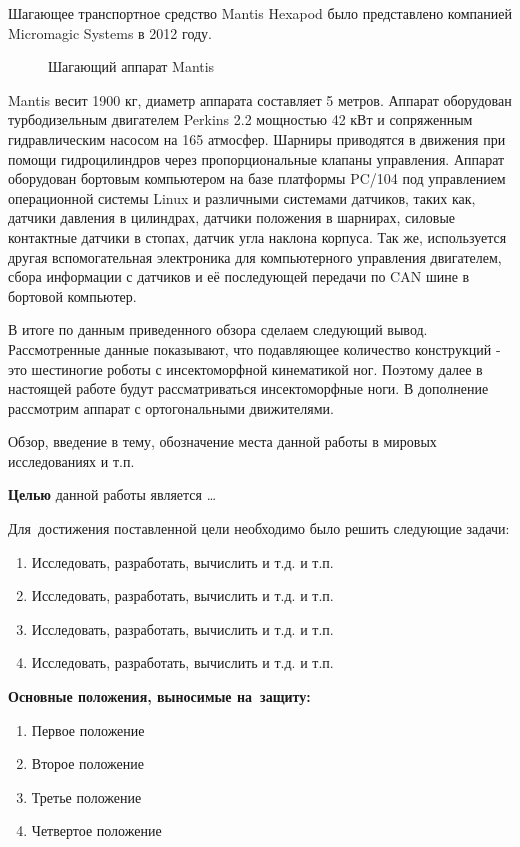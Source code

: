 Шагающее транспортное средство Mantis Hexapod было представлено компанией Micromagic Systems в 2012 году.

\begin{figure}
\center{\texttt{[image: 1209116\_628585443829653\_1753427504\_n]}}
\caption{Шагающий аппарат Mantis}
\end{figure}

Mantis весит 1900 кг, диаметр аппарата составляет 5 метров. Аппарат оборудован турбодизельным двигателем Perkins 2.2 мощностью 42 кВт и сопряженным гидравлическим насосом на 165 атмосфер. Шарниры приводятся в движения при помощи гидроцилиндров через пропорциональные клапаны управления. Аппарат оборудован бортовым компьютером на базе платформы PC/104 под управлением операционной системы Linux и различными системами датчиков, таких как, датчики давления в цилиндрах, датчики положения в шарнирах, силовые контактные датчики в стопах, датчик угла наклона корпуса. Так же, используется другая вспомогательная электроника для компьютерного управления двигателем, сбора информации с датчиков и её последующей передачи по CAN шине в бортовой компьютер.


В итоге по данным приведенного обзора сделаем следующий вывод. Рассмотренные данные показывают, что подавляющее количество конструкций - это шестиногие роботы с инсектоморфной кинематикой ног. Поэтому далее в настоящей работе будут рассматриваться инсектоморфные ноги. В дополнение рассмотрим аппарат с ортогональными движителями.


\clearpage
Обзор, введение в тему, обозначение места данной работы в мировых исследованиях и т.п.

\textbf{Целью} данной работы является \ldots

Для~достижения поставленной цели необходимо было решить следующие задачи:
\begin{enumerate}
  \item Исследовать, разработать, вычислить и т.д. и т.п.
  \item Исследовать, разработать, вычислить и т.д. и т.п.
  \item Исследовать, разработать, вычислить и т.д. и т.п.
  \item Исследовать, разработать, вычислить и т.д. и т.п.
\end{enumerate}

\textbf{Основные положения, выносимые на~защиту:}
\begin{enumerate}
  \item Первое положение
  \item Второе положение
  \item Третье положение
  \item Четвертое положение
\end{enumerate}

